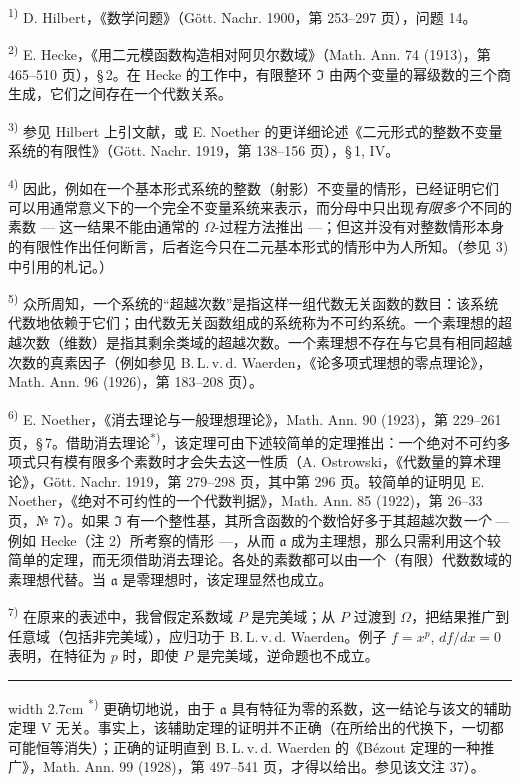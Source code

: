 {\small
\setlength{\parindent}{0pt}
\noindent\textsuperscript{1)} D. Hilbert，《数学问题》（Gött. Nachr. 1900，第 253--297 页），问题 14。

\noindent\textsuperscript{2)} E. Hecke，《用二元模函数构造相对阿贝尔数域》（Math. Ann. 74 (1913)，第 465--510 页），\S\,2。在 Hecke 的工作中，有限整环 $\mathfrak{I}$ 由两个变量的幂级数的三个商生成，它们之间存在一个代数关系。

\noindent\textsuperscript{3)} 参见 Hilbert 上引文献，或 E. Noether 的更详细论述《二元形式的整数不变量系统的有限性》（Gött. Nachr. 1919，第 138--156 页），\S\,1, IV。

\noindent\textsuperscript{4)} 因此，例如在一个基本形式系统的整数（射影）不变量的情形，已经证明它们可以用通常意义下的一个完全不变量系统来表示，而分母中只出现\emph{有限多个}不同的素数 --- 这一结果不能由通常的 $\Omega$-过程方法推出 ---；但这并没有对整数情形本身的有限性作出任何断言，后者迄今只在二元基本形式的情形中为人所知。（参见 3) 中引用的札记。）

\noindent\textsuperscript{5)} 众所周知，一个系统的“超越次数”是指这样一组代数无关函数的数目：该系统代数地依赖于它们；由代数无关函数组成的系统称为不可约系统。一个素理想的超越次数（维数）是指其剩余类域的超越次数。一个素理想不存在与它具有相同超越次数的真素因子（例如参见 B.\,L.\,v.\,d. Waerden，《论多项式理想的零点理论》，Math. Ann. 96 (1926)，第 183--208 页）。

\noindent\textsuperscript{6)} E. Noether，《消去理论与一般理想理论》，Math. Ann. 90 (1923)，第 229--261 页，\S\,7。借助消去理论\textsuperscript{*)}，该定理可由下述较简单的定理推出：一个绝对不可约多项式只有模有限多个素数时才会失去这一性质（A. Ostrowski，《代数量的算术理论》，Gött. Nachr. 1919，第 279--298 页，其中第 296 页。较简单的证明见 E. Noether，《绝对不可约性的一个代数判据》，Math. Ann. 85 (1922)，第 26--33 页，№ 7）。如果 $\mathfrak{I}$ 有一个整性基，其所含函数的个数恰好多于其超越次数\emph{一个} --- 例如 Hecke（注 2）所考察的情形 ---，从而 $\mathfrak{a}$ 成为主理想，那么只需利用这个较简单的定理，而无须借助消去理论。各处的素数都可以由一个（有限）代数数域的素理想代替。当 $\mathfrak{a}$ 是零理想时，该定理显然也成立。

\noindent\textsuperscript{7)} 在原来的表述中，我曾假定系数域 $P$ 是完美域；从 $P$ 过渡到 $\Omega$，把结果推广到任意域（包括非完美域），应归功于 B.\,L.\,v.\,d. Waerden。例子 $f=x^p$, $df/dx=0$ 表明，在特征为 $p$ 时，即使 $P$ 是完美域，逆命题也不成立。

\medskip
\hrule width 2.7cm
\smallskip
\noindent\textsuperscript{*)} 更确切地说，由于 $\mathfrak{a}$ 具有特征为零的系数，这一结论与该文的辅助定理 V 无关。事实上，该辅助定理的证明并不正确（在所给出的代换下，一切都可能恒等消失）；正确的证明直到 B.\,L.\,v.\,d. Waerden 的《Bézout 定理的一种推广》，Math. Ann. 99 (1928)，第 497--541 页，才得以给出。参见该文注 37）。

}
